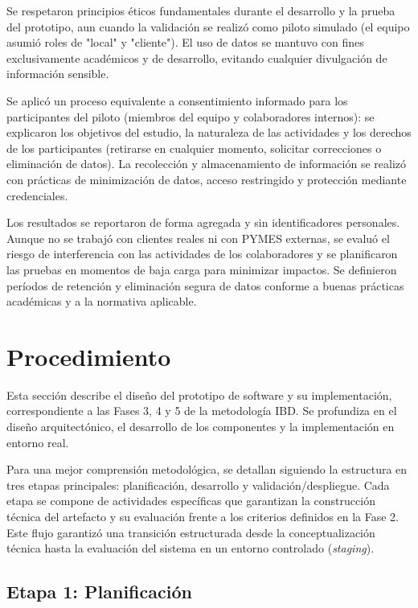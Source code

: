   Se respetaron principios éticos fundamentales durante el desarrollo y la prueba del prototipo, aun cuando la validación se realizó como piloto simulado (el equipo asumió roles de "local" y "cliente"). El uso de datos se mantuvo con fines exclusivamente académicos y de desarrollo, evitando cualquier divulgación de información sensible.

  Se aplicó un proceso equivalente a consentimiento informado para los participantes del piloto (miembros del equipo y colaboradores internos): se explicaron los objetivos del estudio, la naturaleza de las actividades y los derechos de los participantes (retirarse en cualquier momento, solicitar correcciones o eliminación de datos). La recolección y almacenamiento de información se realizó con prácticas de minimización de datos, acceso restringido y protección mediante credenciales.

  Los resultados se reportaron de forma agregada y sin identificadores personales. Aunque no se trabajó con clientes reales ni con PYMES externas, se evaluó el riesgo de interferencia con las actividades de los colaboradores y se planificaron las pruebas en momentos de baja carga para minimizar impactos. Se definieron períodos de retención y eliminación segura de datos conforme a buenas prácticas académicas y a la normativa aplicable.

  \section{Procedimiento}

  Esta sección describe el diseño del prototipo de software y su implementación, correspondiente a las Fases 3, 4 y 5 de la metodología IBD. Se profundiza en el diseño arquitectónico, el desarrollo de los componentes y la implementación en entorno real.

  Para una mejor comprensión metodológica, se detallan siguiendo la estructura en tres etapas principales: planificación, desarrollo y validación/despliegue. Cada etapa se compone de actividades específicas que garantizan la construcción técnica del artefacto y su evaluación frente a los criterios definidos en la Fase 2.
  Este flujo garantizó una transición estructurada desde la conceptualización técnica hasta la evaluación del sistema en un entorno controlado (\textit{staging}).

  \subsection{Etapa 1: Planificación}

